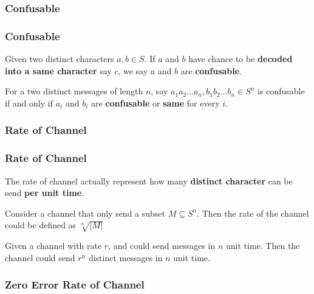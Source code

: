 \subsubsection*{Confusable}

      \begin{frame}
            \frametitle{Confusable}
            \begin{definition}[confusable]
                  Given two distinct characters $a, b \in S$. If $a$ and $b$ have chance to be \textbf{decoded into a same character} say $c$, we say $a$ and $b$ are \textbf{confusable}.

                  For a two distinct messages of length $n$, say $a_{1}a_{2}\dots a_{n}, b_{1}b_{2}\dots b_{n} \in S^{n}$ is confusable if and only if $a_{i}$ and $b_{i}$ are \textbf{confusable} or \textbf{same} for every $i$.
            \end{definition}
      \end{frame}

\subsubsection*{Rate of Channel}

      \begin{frame}
            \frametitle{Rate of Channel}

            \begin{definition}
                  The rate of channel actually represent how many \textbf{distinct character} can be send \textbf{per unit time}.

                  \pause

                  \vspace{0.5em}

                  Consider a channel that only send a subset $ M \subseteq S^{n} $.
                  Then the rate of the channel could be defined as $ \sqrt[n]{|M|} $
                  
            \end{definition}

            Given a channel with rate $r$, and could send messages in $n$ unit time. Then the channel could send $r^{n}$ distinct messages in $n$ unit time.
      \end{frame}

\subsubsection*{Zero Error Rate of Channel}

